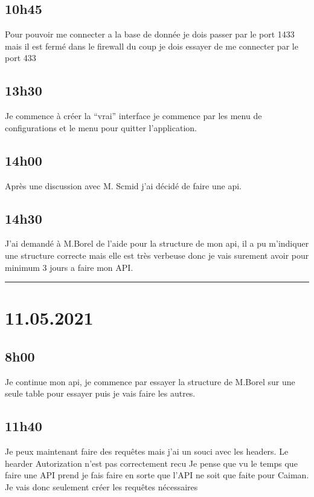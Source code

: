 \documentclass[a4paper,12pt,french]{sphinxmanual}
\begin{document}
\subsection{10h45}
\label{\detokenize{logbook:id92}}
\sphinxAtStartPar
Pour pouvoir me connecter a la base de donnée je dois passer par le port 1433 mais il est fermé dans le firewall du coup je dois essayer de me connecter par le port 433


\subsection{13h30}
\label{\detokenize{logbook:id93}}
\sphinxAtStartPar
Je commence à créer la “vrai” interface je commence par les menu de configurations et le menu pour quitter l’application.


\subsection{14h00}
\label{\detokenize{logbook:id94}}
\sphinxAtStartPar
Après une discussion avec M. Scmid j’ai décidé de faire une api.


\subsection{14h30}
\label{\detokenize{logbook:id95}}
\sphinxAtStartPar
J’ai demandé à M.Borel de l’aide pour la structure de mon api, il a pu m’indiquer une structure correcte mais elle est très verbeuse donc je vais surement avoir pour minimum 3 jours a faire mon API.


\bigskip\hrule\bigskip



\section{11.05.2021}
\label{\detokenize{logbook:id96}}

\subsection{8h00}
\label{\detokenize{logbook:id97}}
\sphinxAtStartPar
Je continue mon api, je commence par essayer la structure de M.Borel sur une seule table pour essayer puis je vais faire les autres.


\subsection{11h40}
\label{\detokenize{logbook:id98}}
\sphinxAtStartPar
Je peux maintenant faire des requêtes mais j’ai un souci avec les headers.
Le hearder Autorization n’est pas correctement recu
Je pense que vu le temps que faire une API prend je fais faire en sorte que l’API ne soit que faite pour Caiman. Je vais donc seulement créer les requêtes nécessaires
\end{document}

